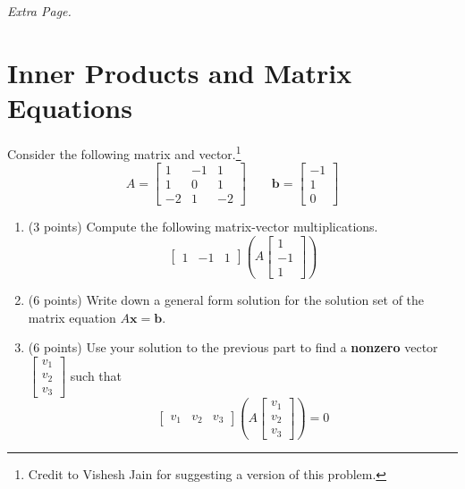 \documentclass{article}
\theoremstyle{remark}
\newcommand{\vv}[1]{\mathbf{#1}}
\begin{document}
\pagebreak
\noindent\textit{Extra Page.}

\pagebreak
\section{Inner Products and Matrix Equations}

Consider the following matrix and vector.\footnote{Credit to Vishesh Jain for suggesting a version of this problem.}
\begin{displaymath}
  A =
  \begin{bmatrix}
    1 & -1 & 1 \\
    1 & 0 & 1 \\
    -2 & 1 & -2
  \end{bmatrix}
  \qquad
  \vv b =
  \begin{bmatrix}
    -1 \\ 1 \\ 0
  \end{bmatrix}
\end{displaymath}
\begin{enumerate}
\item (3 points) Compute the following matrix-vector multiplications.
  \begin{displaymath}
    \begin{bmatrix}
      1 & -1 & 1
    \end{bmatrix}
    \left(
    A
    \begin{bmatrix}
      1 \\ -1 \\ 1
    \end{bmatrix}
    \right)
  \end{displaymath}
\item (6 points) Write down a general form solution for the solution set of the  matrix equation $A \vv x = \vv b$.
\item (6 points) Use your solution to the previous part to find a \textbf{nonzero} vector $\begin{bmatrix} v_1 \\ v_2 \\ v_3 \end{bmatrix}$ such that
  \begin{displaymath}
    \begin{bmatrix}
      v_1 & v_2 & v_3
    \end{bmatrix}
    \left(A
    \begin{bmatrix}
      v_1 \\ v_2 \\ v_3
    \end{bmatrix}\right)
    = 0
  \end{displaymath}
\end{enumerate}
\end{document}
